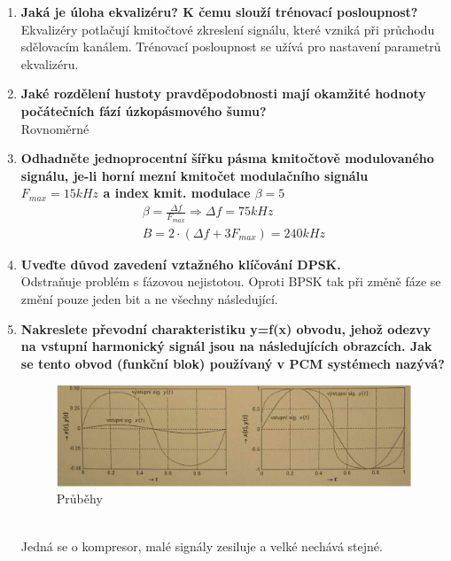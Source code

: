 \begin{enumerate}
    \item \textbf{Jaká je úloha ekvalizéru? K čemu slouží trénovací posloupnost?}\\
    Ekvalizéry potlačují kmitočtové zkreslení signálu, které vzniká při průchodu sdělovacím kanálem. Trénovací posloupnost se užívá pro nastavení parametrů ekvalizéru.
    \item \textbf{Jaké rozdělení hustoty pravděpodobnosti mají okamžité hodnoty počátečních fází úzkopásmového šumu?}\\
    Rovnoměrné
    \item \textbf{Odhadněte jednoprocentní šířku pásma kmitočtově modulovaného signálu, je-li horní mezní
    kmitočet modulačního signálu \(F_{max} =15 kHz\) a index kmit. modulace \(\beta=5\)}
    \begin{gather*}
        \beta = \frac{\Delta f}{F_{max}} \Rightarrow \Delta f = 75kHz\\
        B = 2\cdot (\Delta f + 3 F_{max}) = 240kHz
    \end{gather*}
    \item \textbf{Uveďte důvod zavedení vztažného klíčování DPSK.}\\
    Odstraňuje problém s fázovou nejistotou. Oproti BPSK tak při změně fáze se změní pouze jeden bit a ne všechny následující.
    \item \textbf{Nakreslete převodní charakteristiku y=f(x) obvodu, jehož odezvy na vstupní harmonický
    signál jsou na následujících obrazcích. Jak se tento obvod (funkční blok) používaný v PCM
    systémech nazývá?}\\
    \begin{figure}[h]
        \centering
        \includegraphics[scale = 0.3]{images/4.10.png}
        \caption{Průběhy}
    \end{figure}\\
    Jedná se o kompresor, malé signály zesiluje a velké nechává stejné.\\
\end{enumerate}

